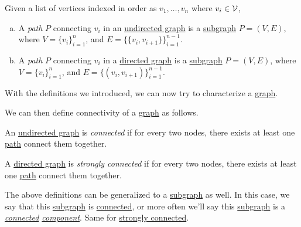 \begin{definition}[Path]\label{def:path}
	Given a list of vertices indexed in order as \(v_1, \ldots , v_n\) where \(v_i\in \mathcal{\MakeUppercase{v}} \),
	\begin{enumerate}[(a)]
		\item A \emph{path} \(P\) connecting \(v_i\) in an \hyperref[def:undirected-graph]{undirected graph} is a \hyperref[def:subgraph]{subgraph} \(P = (V, E)\), where \(V=\{v_i\}_{i=1}^n\), and
		      \(E = \{\{v_i, v_{i+1}\}\}_{i = 1}^{n-1}\).
		\item A \emph{path} \(P\) connecting \(v_i\) in a \hyperref[def:directed-graph]{directed graph} is a \hyperref[def:subgraph]{subgraph} \(P = (V, E)\), where \(V=\{v_i\}_{i=1}^n\), and
		      \(E = \{(v_i, v_{i+1})\}_{i = 1}^{n-1}\).
	\end{enumerate}
\end{definition}

With the definitions we introduced, we can now try to characterize a \hyperref[def:graph]{graph}.

\begin{definition*}
	We can then define connectivity of a \hyperref[def:graph]{graph} as follows.
	\begin{definition}[Connected]\label{def:connected}
		An \hyperref[def:undirected-graph]{undirected graph} is \emph{connected} if for every two nodes, there exists at least one \hyperref[def:path]{path} connect them together.
	\end{definition}

	\begin{definition}\label{def:strongly-connected}
		A \hyperref[def:directed-graph]{directed graph} is \emph{strongly connected} if for every two nodes, there exists at least one \hyperref[def:path]{path} connect them together.
	\end{definition}
\end{definition*}

\begin{notation}
	The above definitions can be generalized to a \hyperref[def:subgraph]{subgraph} as well. In this case, we say that this \hyperref[def:subgraph]{subgraph} is
	\hyperref[def:connected]{connected}, or more often we'll say this \hyperref[def:subgraph]{subgraph} is a \emph{\hyperref[def:connected]{connected} \hyperref[def:subgraph]{component}}.
	Same for \hyperref[def:strongly-connected]{strongly connected}.
\end{notation}


